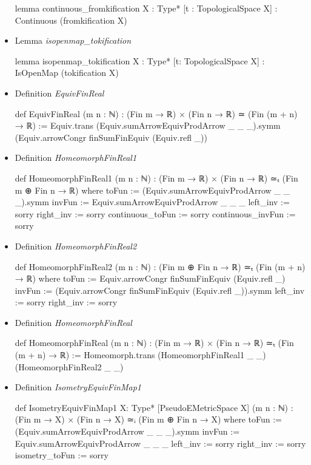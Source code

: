 \documentclass[colorinlistoftodos]{article}
\begin{document}
\begin{itemize}
\begin{leancode}
lemma continuous_fromkification {X : Type*} [t : TopologicalSpace X] : 
Continuous (fromkification X)
\end{leancode}
  \item Lemma \emph{isopenmap\_tokification}
\begin{leancode}
lemma isopenmap_tokification {X : Type*} [t: TopologicalSpace X] : 
IsOpenMap (tokification X)
\end{leancode}
  \item Definition \emph{EquivFinReal}
\begin{leancode}
def EquivFinReal (m n : ℕ) : (Fin m → ℝ) × (Fin n → ℝ) ≃ (Fin (m + n) → ℝ) := 
Equiv.trans (Equiv.sumArrowEquivProdArrow _ _ _).symm 
  (Equiv.arrowCongr finSumFinEquiv (Equiv.refl _))
\end{leancode}
  \item Definition \emph{HomeomorphFinReal1}
\begin{leancode}
def HomeomorphFinReal1 (m n : ℕ) : (Fin m → ℝ) × (Fin n → ℝ) ≃ₜ (Fin m ⊕ Fin n → ℝ) where
  toFun := (Equiv.sumArrowEquivProdArrow _ _ _).symm
  invFun := Equiv.sumArrowEquivProdArrow _ _ _
  left_inv := sorry
  right_inv := sorry
  continuous_toFun := sorry 
  continuous_invFun := sorry
\end{leancode}
  \item Definition \emph{HomeomorphFinReal2}
\begin{leancode}
def HomeomorphFinReal2 (m n : ℕ) : (Fin m ⊕ Fin n → ℝ) ≃ₜ (Fin (m + n) → ℝ) where
  toFun := Equiv.arrowCongr finSumFinEquiv (Equiv.refl _)
  invFun := (Equiv.arrowCongr finSumFinEquiv (Equiv.refl _)).symm
  left_inv := sorry
  right_inv := sorry
\end{leancode}
  \item Definition \emph{HomeomorphFinReal}
\begin{leancode}
def HomeomorphFinReal (m n : ℕ) : (Fin m → ℝ) × (Fin n → ℝ) ≃ₜ (Fin (m + n) → ℝ) := 
  Homeomorph.trans (HomeomorphFinReal1 _ _) (HomeomorphFinReal2 _ _)
\end{leancode}
  \item Definition \emph{IsometryEquivFinMap1}
\begin{leancode}
def IsometryEquivFinMap1 {X: Type*} [PseudoEMetricSpace X] (m n : ℕ) : 
(Fin m → X) × (Fin n → X) ≃ᵢ (Fin m ⊕ Fin n → X) where
  toFun := (Equiv.sumArrowEquivProdArrow _ _ _).symm
  invFun := Equiv.sumArrowEquivProdArrow _ _ _
  left_inv := sorry
  right_inv := sorry
  isometry_toFun := sorry

\end{leancode}
\end{itemize}
\end{document}

